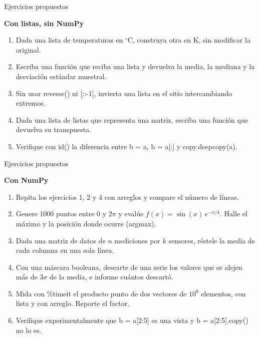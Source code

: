 \documentclass[aspectratio=169, 11pt]{beamer}
\newcommand{\code}[1]{{\ttfamily\small\color{textoOscuro}#1}}
\newcommand{\subt}[1]{%
  \par\smallskip
  \noindent{\color{borgonaClaro}\rule{3pt}{0.95em}}\hspace{0.5em}%
  {\color{borgonaMedio}\bfseries #1}\par\vspace{0.3em}
}
\begin{document}
\begin{frame}[fragile]{Ejercicios propuestos}
\subt{Con listas, sin NumPy}
\begin{enumerate}
  \item Dada una lista de temperaturas en $^\circ$C, construya otra en K, sin modificar la original.
  \item Escriba una función que reciba una lista y devuelva la media, la mediana y la desviación estándar muestral.
  \item Sin usar \code{reverse()} ni \code{[::-1]}, invierta una lista en el sitio intercambiando extremos.
  \item Dada una lista de listas que representa una matriz, escriba una función que devuelva su transpuesta.
  \item Verifique con \code{id()} la diferencia entre \code{b = a}, \code{b = a[:]} y \code{copy.deepcopy(a)}.
\end{enumerate}
\end{frame}

\begin{frame}[fragile]{Ejercicios propuestos}
\subt{Con NumPy}
\begin{enumerate}\small
  \setcounter{enumi}{5}
  \item Repita los ejercicios 1, 2 y 4 con arreglos y compare el número de líneas.
  \item Genere 1000 puntos entre 0 y $2\pi$ y evalúe $f(x)=\sin(x)\,e^{-x/4}$. Halle el máximo y la posición donde ocurre (\code{argmax}).
  \item Dada una matriz de datos de $n$ mediciones por $k$ sensores, réstele la media de cada columna en una sola línea.
  \item Con una máscara booleana, descarte de una serie los valores que se alejen más de $3\sigma$ de la media, e informe cuántos descartó.
  \item Mida con \code{\%timeit} el producto punto de dos vectores de $10^6$ elementos, con lista y con arreglo. Reporte el factor.
  \item Verifique experimentalmente que \code{b = a[2:5]} es una vista y \code{b = a[2:5].copy()} no lo es.
\end{enumerate}
\end{frame}
\end{document}
